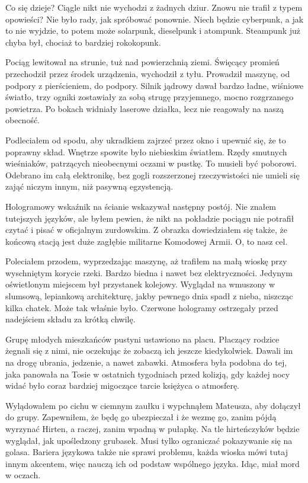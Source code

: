 \divider{}

Co się dzieje? 
Ciągle nikt nie wychodzi z żadnych dziur.
Znowu nie trafił z typem opowieści?
Nie było rady, jak spróbować ponownie.
Niech będzie cyberpunk, a jak to nie wyjdzie, to potem może solarpunk, dieselpunk i atompunk. 
Steampunk już chyba był, chociaż to bardziej rokokopunk.

\divider{}

Pociąg lewitował na strunie, tuż nad powierzchnią ziemi.
Święcący promień przechodził przez środek urządzenia, wychodził z tyłu.
Prowadził maszynę, od podpory z pierścieniem, do podpory.
Silnik jądrowy dawał bardzo ładne, wiśniowe światło, trzy ogniki zostawiały za sobą strugę przyjemnego, mocno rozgrzanego powietrza.
Po bokach widniały laserowe działka, lecz nie reagowały na naszą obecność.

Podleciałem od spodu, aby ukradkiem zajrzeć przez okno i upewnić się, że to poprawny skład.
Wnętrze spowite było niebieskim światłem.
Rzędy smutnych wieśniaków, patrzących nieobecnymi oczami w pustkę.
To musieli być poborowi.
Odebrano im całą elektronikę, bez gogli rozszerzonej rzeczywistości nie umieli się zająć niczym innym, niż pasywną egzystencją.

Hologramowy wskaźnik na ścianie wskazywał następny postój.
Nie znałem tutejszych języków, ale byłem pewien, że nikt na pokładzie pociągu nie potrafił czytać i pisać w oficjalnym zurdowskim.
Z obrazka dowiedziałem się także, że końcową stacją jest duże zagłębie militarne Komodowej Armii.
O, to nasz cel.

Poleciałem przodem, wyprzedzając maszynę, aż trafiłem na małą wioskę przy wyschniętym korycie rzeki.
Bardzo biedna i nawet bez elektryczności.
Jedynym oświetlonym miejscem był przystanek kolejowy.
Wyglądał na wmuszony w slumsową, lepiankową architekturę, jakby pewnego dnia spadł z nieba, niszcząc kilka chatek. Może tak właśnie było.
Czerwone hologramy ostrzegały przed nadejściem składu za krótką chwilę.

Grupę młodych mieszkańców pustyni ustawiono na placu.
Płaczący rodzice żegnali się z nimi, nie oczekując że zobaczą ich jeszcze kiedykolwiek.
Dawali im na drogę ubrania, jedzenie, a nawet zabawki.
Atmosfera była podobna do tej, jaka panowała na Tosie w ostatnich tygodniach przed kolizją, gdy każdej nocy widać było coraz bardziej migoczące tarcie księżyca o atmosferę.

Wylądowałem po cichu w ciemnym zaułku i wypchnąłem Mateusza, aby dołączył do grupy.
Zapewniłem, że będę go ubezpieczał i że wezmę go, zanim pójdą wyrzynać Hirten, a raczej, zanim wpadną w pułapkę.
Na tle hirteńczyków będzie wyglądał, jak upośledzony grubasek. Musi tylko ograniczać pokazywanie się na golasa.
Bariera językowa także nie sprawi problemu, każda wioska mówi tutaj innym akcentem, więc nauczą ich od podstaw wspólnego języka.
Idąc, miał mord w oczach.

